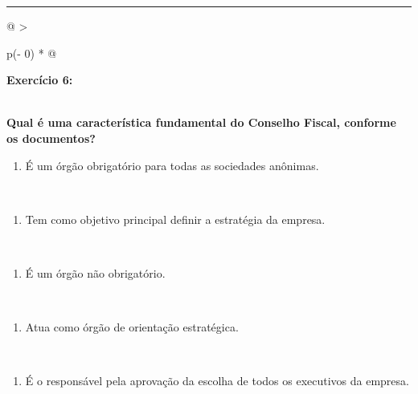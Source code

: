 \documentclass[
]{book}
\providecommand{\tightlist}{%
  \setlength{\itemsep}{0pt}\setlength{\parskip}{0pt}}
\begin{document}
\begin{center}\rule{0.5\linewidth}{0.5pt}\end{center}

\begin{longtable}[]{@{}
  >{\raggedright\arraybackslash}p{(\columnwidth - 0\tabcolsep) * }@{}}
\toprule\noalign{}
\begin{minipage}[b]{\linewidth}\raggedright
\textbf{Exercício 6:}
\end{minipage} \\
\midrule\noalign{}
\endhead
\bottomrule\noalign{}
\endlastfoot
\textbf{Qual é uma característica fundamental do Conselho Fiscal, conforme os documentos?} \\
\begin{minipage}[t]{\linewidth}\raggedright
\begin{enumerate}
\def\labelenumi{\alph{enumi})}
\tightlist
\item
  É um órgão obrigatório para todas as sociedades anônimas.
\end{enumerate}
\end{minipage} \\
\begin{minipage}[t]{\linewidth}\raggedright
\begin{enumerate}
\def\labelenumi{\alph{enumi})}
\setcounter{enumi}{1}
\tightlist
\item
  Tem como objetivo principal definir a estratégia da empresa.
\end{enumerate}
\end{minipage} \\
\begin{minipage}[t]{\linewidth}\raggedright
\begin{enumerate}
\def\labelenumi{\alph{enumi})}
\setcounter{enumi}{2}
\tightlist
\item
  É um órgão não obrigatório.
\end{enumerate}
\end{minipage} \\
\begin{minipage}[t]{\linewidth}\raggedright
\begin{enumerate}
\def\labelenumi{\alph{enumi})}
\setcounter{enumi}{3}
\tightlist
\item
  Atua como órgão de orientação estratégica.
\end{enumerate}
\end{minipage} \\
\begin{minipage}[t]{\linewidth}\raggedright
\begin{enumerate}
\def\labelenumi{\alph{enumi})}
\setcounter{enumi}{4}
\tightlist
\item
  É o responsável pela aprovação da escolha de todos os executivos da empresa.
\end{enumerate}
\end{minipage} \\
\end{longtable}
\end{document}
